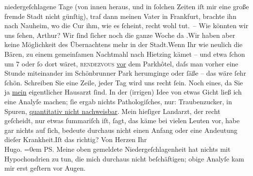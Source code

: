 {\begin{ledgroupsized}[t]{13cm}
               niedergeſchlagene Tage (von innen heraus, und in ſolchen Zeiten iſt mir eine große
               fremde Stadt nicht günſtig), traf dann meinen Vater in Frankfurt,
               brachte ihn nach Nauheim, wo die Cur ihm, wie es
               ſcheint, recht wohl tut. – Wie {\pb}könnten wir uns ſehen, Arthur? Wir ſind ſicher noch die ganze Woche da \label{K_L02182_3v}\label{K_L02182_3h}.\hspace*{1.5em}Wir haben aber keine Möglichkeit des Übernachtens mehr
               in der Stadt.\hspace*{1.5em}Wenn Ihr wie neulich die Bären, zu einem gemeinſamen Nachtmahl nach
                  Hietzing kämet – und etwa ſchon um 7
               oder ſo dort wäret, \textsc{rendezvous}{ }\uline{vor} dem Parkhôtel,
               daſs man {\pb}vorher eine Stunde
               miteinander im Schönbrunner Park herumginge oder
               ſäße – das wäre ſehr ſchön. Schreiben Sie eine Zeile, jeder Tag wird uns recht
               ſein.\pend
           \pstart
           Noch eines, da Sie ja \uline{mein} eigentlicher Hausarzt
               ſind. In der (irrigen) Idee von etwas Gicht ließ ich eine Analyſe machen; ſie ergab
               nichts Pathologiſches, nur: Traubenzucker,  in
               Spuren, {\pb}\uline{quantitativ nicht nachweisbar}. Mein hieſiger Landarzt, der recht geſcheidt,
               nur etwas ſummariſch iſt, ſagt, das käme bei vielen Leuten vor, habe gar nichts auf
               ſich, bedeute durchaus nicht einen Anfang oder eine Andeutung dieſer Krankheit.\hspace*{1.5em}Iſt das richtig?\pend
           \pstart
           Von Herzen Ihr{\\[\baselineskip]}\spacefill\mbox{Hugo.}\pend
           \leftskip=0em{}\pstart
           \noindent{}\textsc{PS}. Meine oben gemeldete Niedergeſchlagenheit hat nichts
                  mit Hypochondrien zu tun, die mich durchaus nicht beſchäftigen; obige Analyſe kam
                  mir erst geſtern vor Augen.\pend
           

\end{ledgroupsized}}
